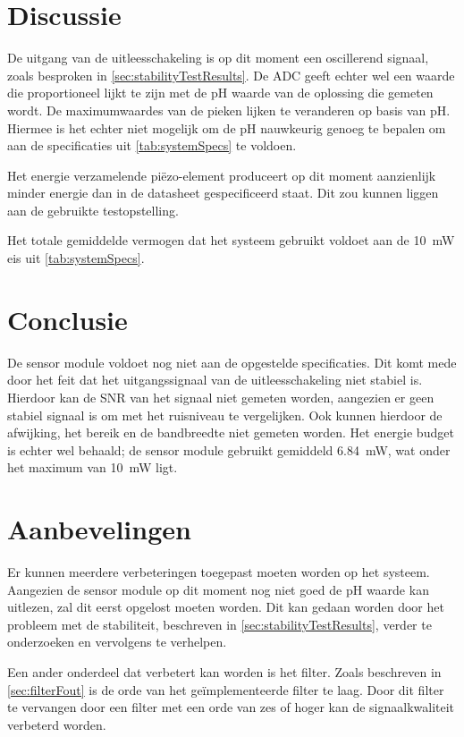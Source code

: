 \section{Discussie}
De uitgang van de uitleesschakeling is op dit moment een oscillerend signaal, zoals besproken in \cref{sec:stabilityTestResults}. De ADC geeft echter wel een waarde die proportioneel lijkt te zijn met de pH waarde van de oplossing die gemeten wordt.
De maximumwaardes van de pieken lijken te veranderen op basis van pH. Hiermee is het echter niet mogelijk om de pH nauwkeurig genoeg te bepalen om aan de specificaties uit \cref{tab:systemSpecs} te voldoen.

Het energie verzamelende piëzo-element produceert op dit moment aanzienlijk minder energie dan in de datasheet gespecificeerd staat. Dit zou kunnen liggen aan de gebruikte testopstelling.

Het totale gemiddelde vermogen dat het systeem gebruikt voldoet aan de \qty{10}{\milli\watt} eis uit \cref{tab:systemSpecs}.

\newpage
\section{Conclusie}
De sensor module voldoet nog niet aan de opgestelde specificaties. Dit komt mede door het feit dat het uitgangssignaal van de uitleesschakeling niet stabiel is. Hierdoor kan de SNR van het signaal niet gemeten worden, aangezien er geen stabiel signaal is om met het ruisniveau te vergelijken. Ook kunnen hierdoor de afwijking, het bereik en de bandbreedte niet gemeten worden.
Het energie budget is echter wel behaald; de sensor module gebruikt gemiddeld \qty{6.84}{\milli\watt}, wat onder het maximum van \qty{10}{\milli\watt} ligt.




\newpage
\section{Aanbevelingen}
Er kunnen meerdere verbeteringen toegepast moeten worden op het systeem. Aangezien de sensor module op dit moment nog niet goed de pH waarde kan uitlezen, zal dit eerst opgelost moeten worden. Dit kan gedaan worden door het probleem met de stabiliteit, beschreven in \cref{sec:stabilityTestResults}, verder te onderzoeken en vervolgens te verhelpen.

Een ander onderdeel dat verbetert kan worden is het filter. Zoals beschreven in \cref{sec:filterFout} is de orde van het geïmplementeerde filter te laag. Door dit filter te vervangen door een filter met een orde van zes of hoger kan de signaalkwaliteit verbeterd worden.

